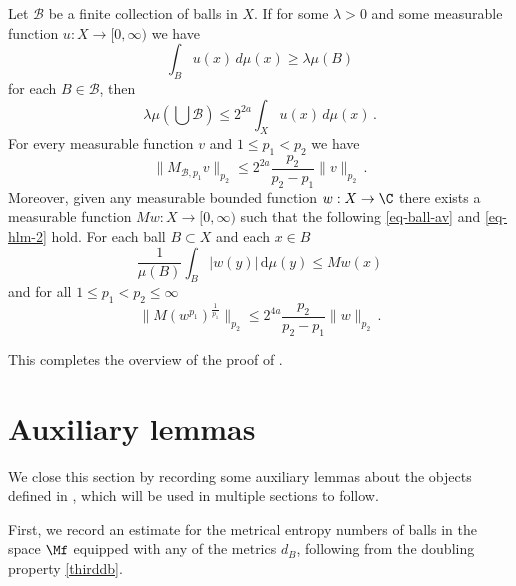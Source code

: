 \begin{proposition}
\label{Hardy-Littlewood}
\leanok
{}
   Let $\mathcal{B}$ be a finite collection of balls in $X$.
If for some $\lambda>0$ and some measurable function $u:X\to [0,\infty)$ we have
\begin{equation}\label{eq-ball-assumption}
\int_{B} u(x)\, d\mu(x)\ge \lambda \mu(B)
\end{equation}
   for each $B\in \mathcal{B}$,
   then
   \begin{equation}\label{eq-besico}
\lambda \mu(\bigcup \mathcal{B}) \le 2^{2a}\int_X u(x)\, d\mu(x)\, .
\end{equation}
For every measurable function $v$
and $1\le p_1<p_2$ we have
\begin{equation}\label{eq-hlm}
    \|M_{\mathcal{B},p_1} v\|_{p_2}\le 2^{2a}\frac{p_2}{p_2-p_1} \|v\|_{p_2}\, .
\end{equation}
Moreover, given any measurable bounded function $w: X \to \C$ there exists a measurable function $Mw: X \to [0, \infty)$ such that the following \eqref{eq-ball-av} and \eqref{eq-hlm-2} hold. For each ball $B \subset X$ and each $x \in B$
\begin{equation}
    \label{eq-ball-av}
    \frac{1}{\mu(B)} \int_{B} |w(y)| \, \mathrm{d}\mu(y) \le Mw(x)
\end{equation}
and for all $1 \le p_1 < p_2 \le \infty$
\begin{equation}
    \label{eq-hlm-2}
    \|M(w^{p_1})^{\frac{1}{p_1}}\|_{p_2} \le 2^{4a} \frac{p_2}{p_2-p_1}\|w\|_{p_2}\,.
\end{equation}

\end{proposition}

This completes the overview of the proof of .

\section{Auxiliary lemmas}
\label{global-auxiliary-lemmas}
We close this section by recording some auxiliary lemmas about the objects defined in , which will be used in multiple sections to follow.

First, we record an estimate for the metrical entropy numbers of balls in the space $\Mf$ equipped with any of the metrics $d_B$, following from the doubling property \eqref{thirddb}.

